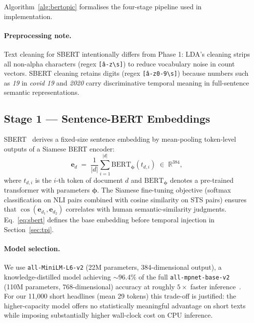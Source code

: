\documentclass[10pt,twocolumn,a4paper]{article}
\newcommand{\R}{\mathbb{R}}
\begin{document}
Algorithm~\ref{alg:bertopic} formalises the four-stage pipeline used in implementation.

\paragraph{Preprocessing note.} Text cleaning for SBERT intentionally differs from Phase 1: LDA's cleaning strips all non-alpha characters (regex \texttt{[\^a-z\textbackslash s]}) to reduce vocabulary noise in count vectors. SBERT cleaning retains digits (regex \texttt{[\^a-z0-9\textbackslash s]}) because numbers such as \emph{19} in \emph{covid 19} and \emph{2020} carry discriminative temporal meaning in full-sentence semantic representations.

\subsection{Stage 1 --- Sentence-BERT Embeddings}
\label{sec:sbert}

SBERT~\cite{reimers2019} derives a fixed-size sentence embedding by mean-pooling token-level outputs of a Siamese BERT encoder:
\begin{equation}
\label{eq:sbert}
\bm{e}_d \;=\; \frac{1}{|d|}\sum_{i=1}^{|d|} \mathrm{BERT}_{\boldsymbol{\phi}}(t_{d,i}) \;\in\; \R^{384},
\end{equation}
where $t_{d,i}$ is the $i$-th token of document $d$ and $\mathrm{BERT}_{\boldsymbol{\phi}}$ denotes a pre-trained transformer with parameters $\boldsymbol{\phi}$. The Siamese fine-tuning objective (softmax classification on NLI pairs combined with cosine similarity on STS pairs) ensures that $\cos(\bm{e}_{d_1}, \bm{e}_{d_2})$ correlates with human semantic-similarity judgments.
Eq.~\eqref{eq:sbert} defines the base embedding before temporal injection in Section~\ref{sec:tpi}.

\paragraph{Model selection.} We use \texttt{all-MiniLM-L6-v2} (22M parameters, 384-dimensional output), a knowledge-distilled model achieving $\sim 96.4\%$ of the full \texttt{all-mpnet-base-v2} (110M parameters, 768-dimensional) accuracy at roughly $5\times$ faster inference~\cite{reimers2019}. For our 11{,}000 short headlines (mean 29 tokens) this trade-off is justified: the higher-capacity model offers no statistically meaningful advantage on short texts while imposing substantially higher wall-clock cost on CPU inference.
\end{document}
